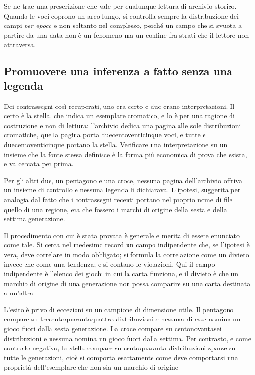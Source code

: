 Se ne trae una prescrizione che vale per qualunque lettura di archivio storico. Quando le voci coprono un arco lungo, si controlla sempre la distribuzione dei campi \emph{per epoca} e non soltanto nel complesso, perché un campo che si svuota a partire da una data non è un fenomeno ma un confine fra strati che il lettore non attraversa.

\subsection{Promuovere una inferenza a fatto senza una legenda}

Dei contrassegni così recuperati, uno era certo e due erano interpretazioni. Il certo è la stella, che indica un esemplare cromatico, e lo è per una ragione di costruzione e non di lettura: l'archivio dedica una pagina alle sole distribuzioni cromatiche, quella pagina porta duecentoventicinque voci, e tutte e duecentoventicinque portano la stella. Verificare una interpretazione su un insieme che la fonte stessa definisce è la forma più economica di prova che esista, e va cercata per prima.

Per gli altri due, un pentagono e una croce, nessuna pagina dell'archivio offriva un insieme di controllo e nessuna legenda li dichiarava. L'ipotesi, suggerita per analogia dal fatto che i contrassegni recenti portano nel proprio nome di file quello di una regione, era che fossero i marchi di origine della sesta e della settima generazione.

Il procedimento con cui è stata provata è generale e merita di essere enunciato come tale. Si cerca nel medesimo record un campo indipendente che, se l'ipotesi è vera, deve correlare in modo obbligato; si formula la correlazione come un divieto invece che come una tendenza; e si contano le violazioni. Qui il campo indipendente è l'elenco dei giochi in cui la carta funziona, e il divieto è che un marchio di origine di una generazione non possa comparire su una carta destinata a un'altra.

L'esito è privo di eccezioni su un campione di dimensione utile. Il pentagono compare su trecentoquarantaquattro distribuzioni e nessuna di esse nomina un gioco fuori dalla sesta generazione. La croce compare su centonovantasei distribuzioni e nessuna nomina un gioco fuori dalla settima. Per contrasto, e come controllo negativo, la stella compare su centoquaranta distribuzioni sparse su tutte le generazioni, cioè si comporta esattamente come deve comportarsi una proprietà dell'esemplare che non sia un marchio di origine.

